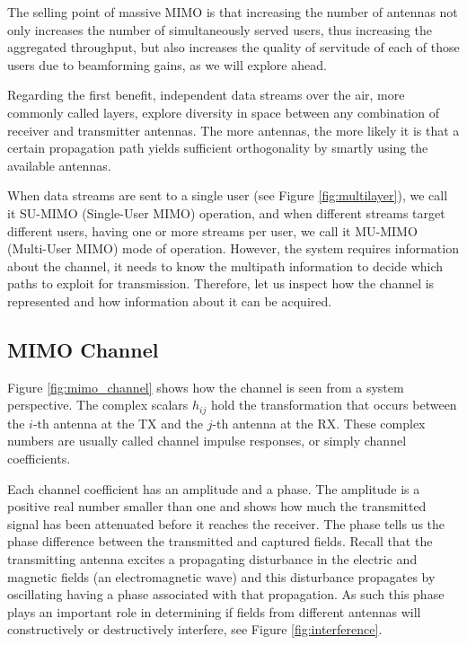 The selling point of massive MIMO is that increasing the number of antennas not only increases the number of simultaneously served users, thus increasing the aggregated throughput, but also increases the quality of servitude of each of those users due to beamforming gains, as we will explore ahead. 

Regarding the first benefit, independent data streams over the air, more commonly called layers, explore diversity in space between any combination of receiver and transmitter antennas. The more antennas, the more likely it is that a certain propagation path yields sufficient orthogonality by smartly using the available antennas.

When data streams are sent to a single user (see Figure \ref{fig:multilayer}), we call it SU-MIMO (Single-User MIMO) operation, and when different streams target different users, having one or more streams per user, we call it MU-MIMO (Multi-User MIMO) mode of operation. However, the system requires information about the channel, it needs to know the multipath information to decide which paths to exploit for transmission. Therefore, let us inspect how the channel is represented and how information about it can be acquired.




\subsection*{MIMO Channel}

Figure \ref{fig:mimo_channel} shows how the channel is seen from a system perspective. The complex scalars $h_{ij}$ hold the transformation that occurs between the $i$-th antenna at the \ac{TX} and the $j$-th antenna at the \ac{RX}. These complex numbers are usually called channel impulse responses, or simply channel coefficients.


Each channel coefficient has an amplitude and a phase. The amplitude is a positive real number smaller than one and shows how much the transmitted signal has been attenuated before it reaches the receiver. The phase tells us the phase difference between the transmitted and captured fields. Recall that the transmitting antenna excites a propagating disturbance in the electric and magnetic fields (an electromagnetic wave) and this disturbance propagates by oscillating having a phase associated with that propagation. As such this phase plays an important role in determining if fields from different antennas will constructively or destructively interfere, see Figure \ref{fig:interference}.

